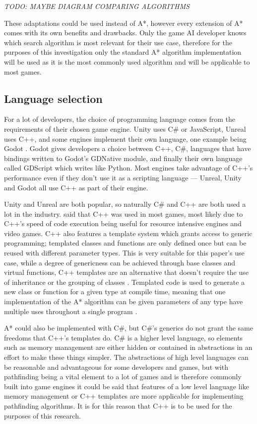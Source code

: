 \documentclass[11pt, a4paper]{report}
\begin{document}
\emph{TODO: MAYBE DIAGRAM COMPARING ALGORITHMS}

These adaptations could be used instead of A*, however every extension of A* comes with its own benefits and drawbacks. Only the game AI developer knows which search algorithm is most relevant for their use case, therefore for the purposes of this investigation only the standard A* algorithm implementation will be used as it is the most commonly used algorithm and will be applicable to most games.

\subsection{Language selection}
\label{subsec:languageSelection}

For a lot of developers, the choice of programming language comes from the requirements of their chosen game engine. Unity \parencite{Unity} uses C\# or JavaScript, Unreal \parencite{Unreal} uses C++, and some engines implement their own language, one example being Godot \parencite{Godot}. Godot gives developers a choice between C++, C\#, languages that have bindings written to Godot's GDNative module, and finally their own language called GDScript which writes like Python. Most engines take advantage of C++'s performance even if they don't use it as a scripting language --- Unreal, Unity and Godot all use C++ as part of their engine. 

Unity \parencite{Unity} and Unreal \parencite{Unreal} are both popular, so naturally C\# and C++ are both used a lot in the industry. \citeauthor{blow2004game} \parencite*[30]{blow2004game} said that C++ was used in most games, most likely due to C++'s speed of code execution being useful for resource intensive engines and video games. C++ also features a template system which grants access to generic programming; templated classes and functions are only defined once but can be reused with different parameter types. This is very suitable for this paper's use case, while a degree of genericness can be achieved through base classes and virtual functions, C++ templates are an alternative that doesn't require the use of inheritance or the grouping of classes \parencite[117]{higgins2002generic}. Templated code is used to generate a new class or function for a given type at compile time, meaning that one implementation of the A* algorithm can be given parameters of any type have multiple uses throughout a single program \parencite[120]{higgins2002generic}.

A* could also be implemented with C\#, but C\#'s generics do not grant the same freedoms that C++'s templates do. C\# is a higher level language, so elements such as memory management are either hidden or contained in abstractions in an effort to make these things simpler. The abstractions of high level languages can be reasonable and advantageous for some developers and games, but with pathfinding being a vital element to a lot of games and is therefore commonly built into game engines it could be said that features of a low level language like memory management or C++ templates are more applicable for implementing pathfinding algorithms. It is for this reason that C++ is to be used for the purposes of this research.
\end{document}

